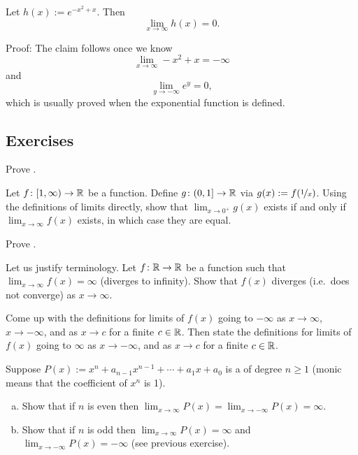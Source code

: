 \begin{example}
Let $h(x) := e^{-x^2+x}$.  Then
\begin{equation*}
\lim_{x\to \infty} h(x) = 0 .
\end{equation*}

Proof:
The claim follows once we know
\begin{equation*}
\lim_{x\to \infty} -x^2+x = -\infty
\end{equation*}
and
\begin{equation*}
\lim_{y\to -\infty} e^y = 0 ,
\end{equation*}
which is usually proved when the exponential function is defined.
\end{example}

\subsection{Exercises}

\begin{exercise}
Prove .
\end{exercise}

\begin{exercise}
Let $f \colon [1,\infty) \to {\mathbb{R}}$ be a function.  Define
$g \colon (0,1] \to {\mathbb{R}}$ via $g(x) := f(\nicefrac{1}{x})$.
Using the definitions of limits directly,
show that $\lim_{x\to 0^+} g(x)$
exists if and only if $\lim_{x\to \infty} f(x)$ exists, in which
case they are equal.
\end{exercise}

\begin{exercise}
Prove .
\end{exercise}

\begin{exercise}
Let us justify terminology.
Let $f \colon {\mathbb{R}} \to {\mathbb{R}}$ be a function such that
$\lim_{x \to \infty} f(x) = \infty$ (diverges to infinity).
Show that $f(x)$ diverges (i.e.\ does not converge) as $x \to \infty$.
\end{exercise}

\begin{exercise}
Come up with the definitions for limits of $f(x)$ going to $-\infty$ as $x \to
\infty$, $x \to -\infty$, and as $x \to c$ for a finite $c \in {\mathbb{R}}$.
Then state the definitions for limits of $f(x)$ going to $\infty$ 
as $x \to -\infty$, and as $x \to c$ for a finite $c \in {\mathbb{R}}$.
\end{exercise}

\begin{exercise}
Suppose $P(x) := x^n + a_{n-1} x^{n-1} + \cdots + a_1 x + a_0$ is a \emph{}
of degree $n \geq 1$ (monic means that the coefficient of $x^n$ is 1).
\begin{enumerate}[a)]
\item
Show that if $n$ is even then $\lim_{x\to\infty} P(x) = 
\lim_{x\to-\infty} P(x) = \infty$.
\item
Show that if $n$ is odd then
$\lim_{x\to\infty} P(x) = \infty$ and
$\lim_{x\to-\infty} P(x) = -\infty$ (see previous exercise).
\end{enumerate}
\end{exercise}


